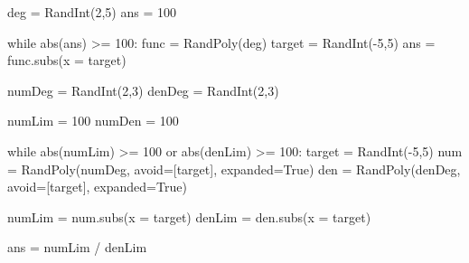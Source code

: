 \begin{sagesilent}

deg = RandInt(2,5)
ans = 100

while abs(ans) >= 100:
    func = RandPoly(deg)
    target = RandInt(-5,5)
    ans = func.subs(x = target)

\end{sagesilent}


\begin{sagesilent}

numDeg = RandInt(2,3)
denDeg = RandInt(2,3)

numLim = 100
numDen = 100

while abs(numLim) >= 100 or abs(denLim) >= 100:
    target = RandInt(-5,5)
    num = RandPoly(numDeg, avoid=[target], expanded=True)
    den = RandPoly(denDeg, avoid=[target], expanded=True)

    numLim = num.subs(x = target)
    denLim = den.subs(x = target)

ans = numLim / denLim

\end{sagesilent}


